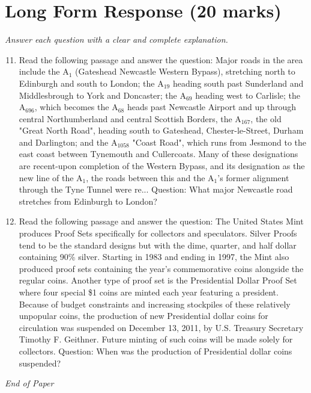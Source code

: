 \documentclass[12pt]{article}
\begin{document}
\section*{Long Form Response (20 marks)}
\textit{Answer each question with a clear and complete explanation.}
\begin{enumerate}[label=\arabic*.]
\setcounter{enumi}{10}
\item Read the following passage and answer the question: Major roads in the area include the A$_{1}$ (Gateshead Newcastle Western Bypass), stretching north to Edinburgh and south to London; the A$_{19}$ heading south past Sunderland and Middlesbrough to York and Doncaster; the A$_{69}$ heading west to Carlisle; the A$_{696}$, which becomes the A$_{68}$ heads past Newcastle Airport and up through central Northumberland and central Scottish Borders, the A$_{167}$, the old "Great North Road", heading south to Gateshead, Chester-le-Street, Durham and Darlington; and the A$_{1058}$ "Coast Road", which runs from Jesmond to the east coast between Tynemouth and Cullercoats. Many of these designations are recent-upon completion of the Western Bypass, and its designation as the new line of the A$_{1}$, the roads between this and the A$_{1}$'s former alignment through the Tyne Tunnel were re... Question: What major Newcastle road stretches from Edinburgh to London?
\item Read the following passage and answer the question: The United States Mint produces Proof Sets specifically for collectors and speculators. Silver Proofs tend to be the standard designs but with the dime, quarter, and half dollar containing 90\% silver. Starting in 1983 and ending in 1997, the Mint also produced proof sets containing the year's commemorative coins alongside the regular coins. Another type of proof set is the Presidential Dollar Proof Set where four special \$1 coins are minted each year featuring a president. Because of budget constraints and increasing stockpiles of these relatively unpopular coins, the production of new Presidential dollar coins for circulation was suspended on December 13, 2011, by U.S. Treasury Secretary Timothy F. Geithner. Future minting of such coins will be made solely for collectors. Question: When was the production of Presidential dollar coins suspended?
\end{enumerate}

\vfill
\noindent\textit{End of Paper}
\end{document}
